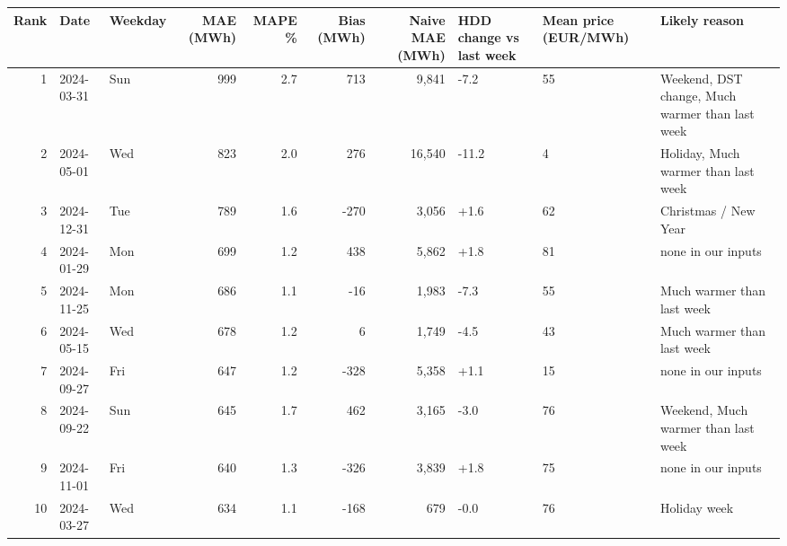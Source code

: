 \begin{tabular}{rllrrrrlll}
\toprule
Rank & Date & Weekday & MAE (MWh) & MAPE \% & Bias (MWh) & Naive MAE (MWh) & HDD change vs last week & Mean price (EUR/MWh) & Likely reason \\
\midrule
1 & 2024-03-31 & Sun & 999 & 2.7 & 713 & 9,841 & -7.2 & 55 & Weekend, DST change, Much warmer than last week \\
2 & 2024-05-01 & Wed & 823 & 2.0 & 276 & 16,540 & -11.2 & 4 & Holiday, Much warmer than last week \\
3 & 2024-12-31 & Tue & 789 & 1.6 & -270 & 3,056 & +1.6 & 62 & Christmas / New Year \\
4 & 2024-01-29 & Mon & 699 & 1.2 & 438 & 5,862 & +1.8 & 81 & none in our inputs \\
5 & 2024-11-25 & Mon & 686 & 1.1 & -16 & 1,983 & -7.3 & 55 & Much warmer than last week \\
6 & 2024-05-15 & Wed & 678 & 1.2 & 6 & 1,749 & -4.5 & 43 & Much warmer than last week \\
7 & 2024-09-27 & Fri & 647 & 1.2 & -328 & 5,358 & +1.1 & 15 & none in our inputs \\
8 & 2024-09-22 & Sun & 645 & 1.7 & 462 & 3,165 & -3.0 & 76 & Weekend, Much warmer than last week \\
9 & 2024-11-01 & Fri & 640 & 1.3 & -326 & 3,839 & +1.8 & 75 & none in our inputs \\
10 & 2024-03-27 & Wed & 634 & 1.1 & -168 & 679 & -0.0 & 76 & Holiday week \\
\bottomrule
\end{tabular}

